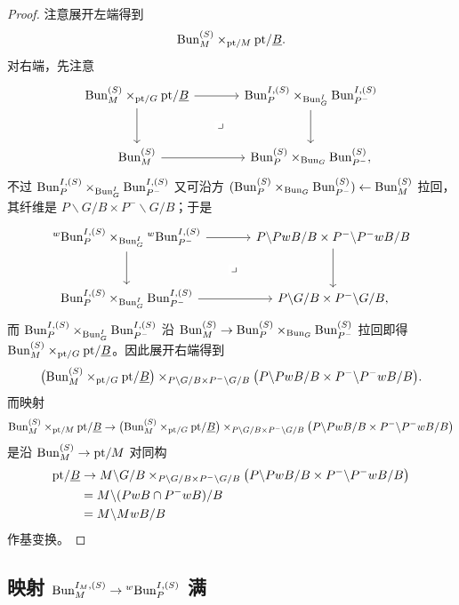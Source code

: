 \begin{proof}
注意展开左端得到
\[
\mathrm{Bun}^{(S)}_M\times_{\mathrm{pt}/M}\mathrm{pt}/\underline{B} .
\]
对右端，先注意
\[
\begin{tikzcd}[column sep=large,row sep=large]
\Bun^{(S)}_M\times_{\pt/G}\pt/\uB \arrow[r] \arrow[d] \arrow[dr,phantom,"\lrcorner" description]
& \Bun^{I,(S)}_P\times_{\Bun^I_G}\Bun^{I,(S)}_{P^-} \arrow[d]\\
\Bun^{(S)}_M \arrow[r] & \Bun^{(S)}_P\times_{\Bun_G}\Bun^{(S)}_{P^-},
\end{tikzcd}
\]
不过 $\mathrm{Bun}^{I,(S)}_P\times_{\mathrm{Bun}^I_G}\mathrm{Bun}^{I,(S)}_{P^-}$ 又可沿方
$(\mathrm{Bun}^{(S)}_P\times_{\mathrm{Bun}_G}\mathrm{Bun}^{(S)}_{P^-})\leftarrow \mathrm{Bun}^{(S)}_M$ 拉回，
其纤维是 $P\backslash G/B\times P^-\backslash G/B$；于是
\[
\begin{tikzcd}[column sep=large,row sep=large]
{}^{w}\Bun^{I,(S)}_P\times_{\Bun^I_G}{}^{w}\Bun^{I,(S)}_{P^-} \arrow[r] \arrow[d]
\arrow[dr,phantom,"\lrcorner" description]
& P\backslash PwB/B\times P^-\backslash P^-wB/B \arrow[d]\\
\Bun^{I,(S)}_P\times_{\Bun^I_G}\Bun^{I,(S)}_{P^-} \arrow[r]
& P\backslash G/B\times P^-\backslash G/B,
\end{tikzcd}
\]
而 $\mathrm{Bun}^{I,(S)}_P\times_{\mathrm{Bun}^I_G}\mathrm{Bun}^{I,(S)}_{P^-}$ 沿
$\mathrm{Bun}^{(S)}_M\to \mathrm{Bun}^{(S)}_P\times_{\mathrm{Bun}_G}\mathrm{Bun}^{(S)}_{P^-}$ 拉回即得
$\mathrm{Bun}^{(S)}_M\times_{\mathrm{pt}/G}\mathrm{pt}/\underline{B}$。因此展开右端得到
\[
\bigl(\mathrm{Bun}^{(S)}_M\times_{\mathrm{pt}/G}\mathrm{pt}/\underline{B}\bigr)
\times_{P\backslash G/B\times P^-\backslash G/B}
\bigl(P\backslash PwB/B\times P^-\backslash P^-wB/B\bigr).
\]
而映射
\[
\mathrm{Bun}^{(S)}_M\times_{\mathrm{pt}/M}\mathrm{pt}/\underline{B}\to
\bigl(\mathrm{Bun}^{(S)}_M\times_{\mathrm{pt}/G}\mathrm{pt}/\underline{B}\bigr)
\times_{P\backslash G/B\times P^-\backslash G/B}
\bigl(P\backslash PwB/B\times P^-\backslash P^-wB/B\bigr)
\]
是沿 $\mathrm{Bun}^{(S)}_M\to \mathrm{pt}/M$ 对同构
\begin{align}
\mathrm{pt}/\underline{B}&\to M\backslash G/B
\times_{P\backslash G/B\times P^-\backslash G/B}
\bigl(P\backslash PwB/B\times P^-\backslash P^-wB/B\bigr)
\label{eq:2.3.1}\\
&=M\backslash (PwB\cap P^-wB)/B
\label{eq:2.3.2}\\
&=M\backslash MwB/B
\label{eq:2.3.3}
\end{align}
作基变换。
\end{proof}

\subsection{\texorpdfstring{映射 $\mathrm{Bun}^{I_M,(S)}_M\to {}^{w}\mathrm{Bun}^{I,(S)}_P$ 满}{映射 IM,(S)M wI,(S)P 满}}
\label{sec:four-b}


